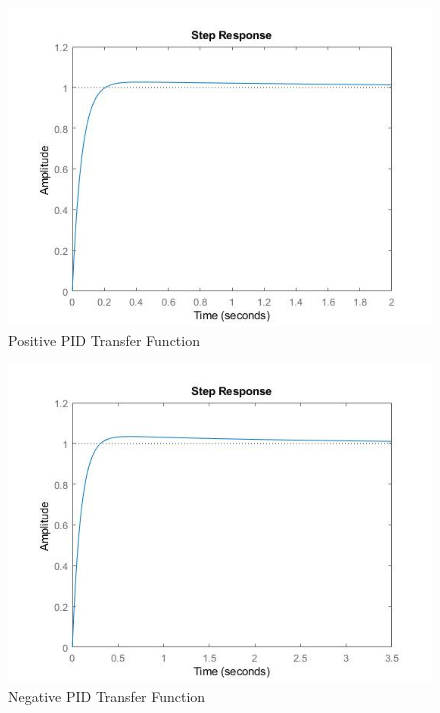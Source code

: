 \begin{figure}[h!]
\centering
    \includegraphics[scale=.4]{posPID.jpg}
    \caption{ Positive PID Transfer Function}
    \label{fig:pos responce}
\end{figure}
\begin{figure}[h!]
    \centering
    \includegraphics[scale=.4]{negPid.jpg}
    \caption{Negative PID Transfer Function}
    \label{fig:neg responce}
\end{figure}